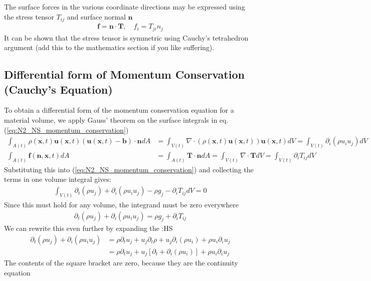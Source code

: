 \documentclass[a4paper, 12pt]{article}
\numberwithin{equation}{subsubsection}
\begin{document}
The surface forces in the various coordinate directions may be expressed using the stress tensor $T_{ij}$ and surface normal $\mathbf{n}$
\begin{align}
	\mathbf{f} = \mathbf{n} \cdot \mathbf{T}, \quad f_i = T_{ji} n_j
\end{align}
It can be shown that the stress tensor is symmetric using Cauchy's tetrahedron argument (add this to the mathematics section if you like suffering).

\subsection{Differential form of Momentum Conservation (Cauchy's Equation)}
To obtain a differential form of the momentum conservation equation for a material volume, we apply Gauss' theorem on the surface integrals in eq. (\ref{eq:N2_NS_momentum_conservation})
\begin{align}
	\int_{A(t)} \rho(\mathbf{x}, t)\mathbf{u}(\mathbf{x}, t) (\mathbf{u}(\mathbf{x}, t) - \mathbf{b}) \cdot \mathbf{n} dA &= \int_{V(t)} \nabla \cdot (\rho(\mathbf{x}, t)\mathbf{u}(\mathbf{x}, t)) \mathbf{u}(\mathbf{x}, t) dV = \int_{V(t)} \partial_i (\rho u_i u_j) dV \\
	\int_{A(t)} \mathbf{f}(\mathbf{n}, \mathbf{x}, t) dA &= \int_{A(t)} \mathbf{T} \cdot \mathbf{n} dA = \int_{V(t)} \nabla \cdot \mathbf{T} dV = \int_{V(t)} \partial_i T_{ij} dV
\end{align}
Substituting this into (\ref{eq:N2_NS_momentum_conservation}) and collecting the terms in one volume integral gives:
\begin{align}
	\int_{V(t)} \partial_t (\rho u_j) + \partial_i (\rho u_i u_j) - \rho g_j - \partial_i T_{ij} dV = 0
\end{align}
Since this must hold for any volume, the integrand must be zero everywhere
\begin{align}
	\partial_t (\rho u_j) + \partial_i (\rho u_i u_j) = \rho g_j + \partial_i T_{ij}
\end{align}
We can rewrite this even further by expanding the :HS
\begin{align}
	\partial_t (\rho u_j) + \partial_i (\rho u_i u_j) &= \rho \partial_t u_j + u_j \partial_t \rho + u_j \partial_i (\rho u_i) + \rho u_i \partial_i u_j \\
	&= \rho \partial_t u_j + u_j\left[\partial_t + \partial_i (\rho u_i) \right] + \rho u_i \partial_i u_j
\end{align}
The contents of the square bracket are zero, because they are the continuity equation
\end{document}
